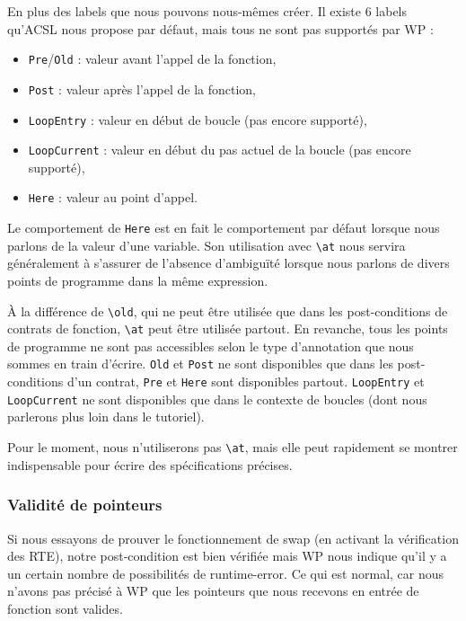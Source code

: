 \documentclass[12pt,francais,]{scrbook}
\providecommand{\tightlist}{%
  \setlength{\itemsep}{0pt}\setlength{\parskip}{0pt}}
\newenvironment{zdsblock}[1]{%
  \tcolorbox[beamer,%
    noparskip,breakable,
    colback=LightBlue,colframe=DarkBlue,%
    colbacklower=DarkBlue,%
    title=#1]
}{\endtcolorbox}
\begin{document}
En plus des labels que nous pouvons nous-mêmes créer. Il existe 6 labels
qu'ACSL nous propose par défaut, mais tous ne sont pas supportés par WP
:

\begin{itemize}
\tightlist
\item
  \texttt{Pre}/\texttt{Old} : valeur avant l'appel de la fonction,
\item
  \texttt{Post} : valeur après l'appel de la fonction,
\item
  \texttt{LoopEntry} : valeur en début de boucle (pas encore supporté),
\item
  \texttt{LoopCurrent} : valeur en début du pas actuel de la boucle (pas
  encore supporté),
\item
  \texttt{Here} : valeur au point d'appel.
\end{itemize}

\begin{zdsblock}{Information}
  Le comportement de \texttt{Here} est
  en fait le comportement par défaut lorsque nous parlons de la
  valeur d'une variable. Son utilisation avec \texttt{\textbackslash{}at}
  nous servira généralement à s'assurer de l'absence
  d'ambiguïté lorsque nous parlons de divers points de
  programme dans la même expression.
\end{zdsblock}

À la différence de \texttt{\textbackslash{}old}, qui ne peut être
utilisée que dans les post-conditions de contrats de fonction,
\texttt{\textbackslash{}at} peut être utilisée partout. En revanche,
tous les points de programme ne sont pas accessibles selon le type
d'annotation que nous sommes en train d'écrire. \texttt{Old} et
\texttt{Post} ne sont disponibles que dans les post-conditions d'un
contrat, \texttt{Pre} et \texttt{Here} sont disponibles partout.
\texttt{LoopEntry} et \texttt{LoopCurrent} ne sont disponibles que dans
le contexte de boucles (dont nous parlerons plus loin dans le tutoriel).

Pour le moment, nous n'utiliserons pas \texttt{\textbackslash{}at}, mais
elle peut rapidement se montrer indispensable pour écrire des
spécifications précises.

\subsubsection{Validité de pointeurs}\label{validituxe9-de-pointeurs}

Si nous essayons de prouver le fonctionnement de swap (en activant la
vérification des RTE), notre post-condition est bien vérifiée mais WP
nous indique qu'il y a un certain nombre de possibilités de
runtime-error. Ce qui est normal, car nous n'avons pas précisé à WP que
les pointeurs que nous recevons en entrée de fonction sont valides.
\end{document}

